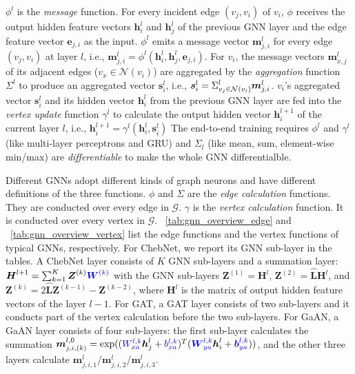 $\phi^l$ is the \emph{message} function.
For every incident edge $(v_j, v_i)$ of $v_i$, $\phi$ receives the output hidden feature vectors $\boldsymbol{h}^l_i$ and $\boldsymbol{h}^l_j$ of the previous GNN layer and the edge feature vector $\boldsymbol{e}_{j,i}$ as the input.
$\phi^l$ emits a message vector $\boldsymbol{m}^l_{j,i}$ for every edge $(v_j, v_i)$ at layer $l$, i.e., $\boldsymbol{m}^l_{j,i}=\phi^l(\boldsymbol{h}^l_i, \boldsymbol{h}^l_j, \boldsymbol{e}_{j,i})$.
For $v_i$, the message vectors $\boldsymbol{m}^l_{x,j}$ of its adjacent edges ($v_x \in \mathcal{N}(v_i)$) are aggregated by the \emph{aggregation} function $\Sigma^l$ to produce an aggregated vector $\boldsymbol{s}^l_i$, i.e., $\boldsymbol{s}^l_i=\mathlarger{\Sigma}^l_{v_j \in \mathcal{N}(v_i)}\boldsymbol{m}^l_{j,i}$.
$v_i$'s aggregated vector $\boldsymbol{s}^l_i$ and its hidden vector $\boldsymbol{h}^l_i$ from the previous GNN layer are fed into the \emph{vertex update} function $\gamma^l$ to calculate the output hidden vector $\boldsymbol{h}^{l+1}_i$ of the current layer $l$, i.e., $\boldsymbol{h}^{l+1}_i = \gamma^l(\boldsymbol{h}^l_i, \boldsymbol{s}^l_i)$
The end-to-end training requires $\phi^l$ and $\gamma^l$ (like multi-layer perceptrons and GRU) and $\Sigma_l$ (like mean, sum, element-wise min/max) are \emph{differentiable} to make the whole GNN differentialble.

Different GNNs adopt different kinds of graph neurons and have different definitions of the three functions.
$\phi$ and $\Sigma$ are the \emph{edge calculation} functions.
They are conducted over every edge in $\mathcal{G}$.
$\gamma$ is the \emph{vertex calculation} function.
It is conducted over every vertex in $\mathcal{G}$.
\tablename~\ref{tab:gnn_overview_edge} and \tablename~\ref{tab:gnn_overview_vertex} list the edge functions and the vertex functions of typical GNNs, respectively.
For ChebNet, we report its GNN sub-layer in the tables.
A ChebNet layer consists of $K$ GNN sub-layers and a summation layer:
$\boldsymbol{H}^{l+1} = \sum_{k=1}^K{\boldsymbol{Z}^{(k)} \textcolor{blue}{\boldsymbol{W}^{(k)}}}$ with the GNN sub-layers $\boldsymbol{Z}^{(1)}=\boldsymbol{H}^l$, $\boldsymbol{Z}^{(2)}=\hat{\boldsymbol{L}}\boldsymbol{H}^l$, and $\boldsymbol{Z}^{(k)}=2\hat{\boldsymbol{L}}\boldsymbol{Z}^{(k-1)} - \boldsymbol{Z}^{(k-2)}$, where $\boldsymbol{H}^l$ is the matrix of output hidden feature vectors of the layer $l-1$.
For GAT, a GAT layer consists of two sub-layers and it conducts part of the vertex calculation before the two sub-layers.
For GaAN, a GaAN layer consists of four sub-layers: the first sub-layer calculates the summation $\boldsymbol{m}_{j, i, (k)}^{l,0}  = \exp((\textcolor{blue}{W^{l, k}_{xa}} \boldsymbol{h}_j^l + \textcolor{blue}{b^{l, k}_{xa}})^T (\textcolor{blue}{\boldsymbol{W}^{l, k}_{ya}} \boldsymbol{h}_i^l + \textcolor{blue}{\boldsymbol{b}^{l,k}_{ya}}))$, and the other three layers calculate $\boldsymbol{m}^l_{j,i,1}$/$\boldsymbol{m}^l_{j,i,2}$/$\boldsymbol{m}^l_{j,i,3}$.

